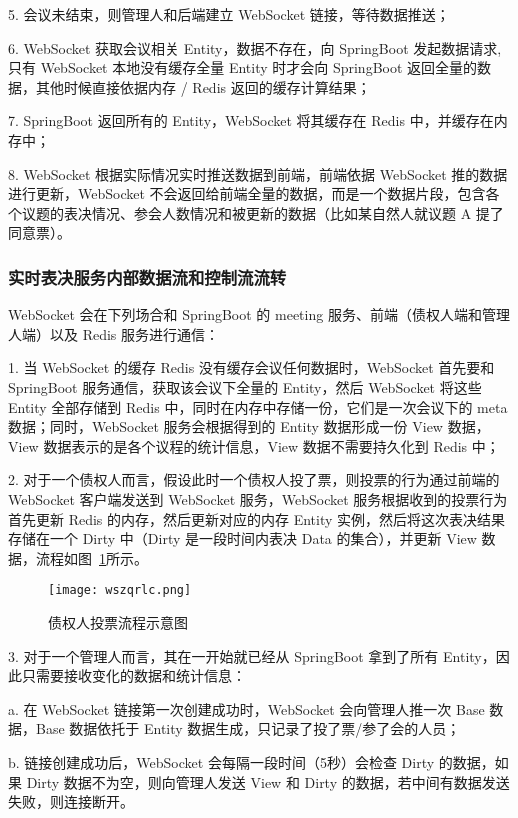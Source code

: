   \quad{}5. 会议未结束，则管理人和后端建立 WebSocket 链接，等待数据推送；
  
  \quad{}6. WebSocket 获取会议相关 Entity，数据不存在，向 SpringBoot 发起数据请求,只有 WebSocket 本地没有缓存全量 Entity 时才会向 SpringBoot 返回全量的数据，其他时候直接依据内存 / Redis 返回的缓存计算结果；
  
  \quad{}7. SpringBoot 返回所有的 Entity，WebSocket 将其缓存在 Redis 中，并缓存在内存中；
  
  \quad{}8. WebSocket 根据实际情况实时推送数据到前端，前端依据 WebSocket 推的数据进行更新，WebSocket 不会返回给前端全量的数据，而是一个数据片段，包含各个议题的表决情况、参会人数情况和被更新的数据（比如某自然人就议题 A 提了同意票）。

  \subsubsection{实时表决服务内部数据流和控制流流转}
  WebSocket 会在下列场合和 SpringBoot 的 meeting 服务、前端（债权人端和管理人端）以及 Redis 服务进行通信：

  \quad{}1. 当 WebSocket 的缓存 Redis 没有缓存会议任何数据时，WebSocket 首先要和 SpringBoot 服务通信，获取该会议下全量的 Entity，然后 WebSocket 将这些 Entity 全部存储到 Redis 中，同时在内存中存储一份，它们是一次会议下的 meta 数据；同时，WebSocket 服务会根据得到的 Entity 数据形成一份 View 数据，View 数据表示的是各个议程的统计信息，View 数据不需要持久化到 Redis 中；
  
  \quad{}2. 对于一个债权人而言，假设此时一个债权人投了票，则投票的行为通过前端的 WebSocket 客户端发送到 WebSocket 服务，WebSocket 服务根据收到的投票行为首先更新 Redis 的内存，然后更新对应的内存 Entity 实例，然后将这次表决结果存储在一个 Dirty 中（Dirty 是一段时间内表决 Data 的集合），并更新 View 数据，流程如图~\ref{fig:wszqrlc}所示。

  \begin{figure}[!htp]
      \centering
      \texttt{[image: wszqrlc.png]}
      \caption{债权人投票流程示意图}
      \label{fig:wszqrlc}
    \end{figure}

  \quad{}3. 对于一个管理人而言，其在一开始就已经从 SpringBoot 拿到了所有 Entity，因此只需要接收变化的数据和统计信息：

  \quad{}\quad{}a. 在 WebSocket 链接第一次创建成功时，WebSocket 会向管理人推一次 Base 数据，Base 数据依托于 Entity 数据生成，只记录了投了票/参了会的人员；

  \quad{}\quad{}b. 链接创建成功后，WebSocket 会每隔一段时间（5秒）会检查 Dirty 的数据，如果 Dirty 数据不为空，则向管理人发送 View 和 Dirty 的数据，若中间有数据发送失败，则连接断开。
